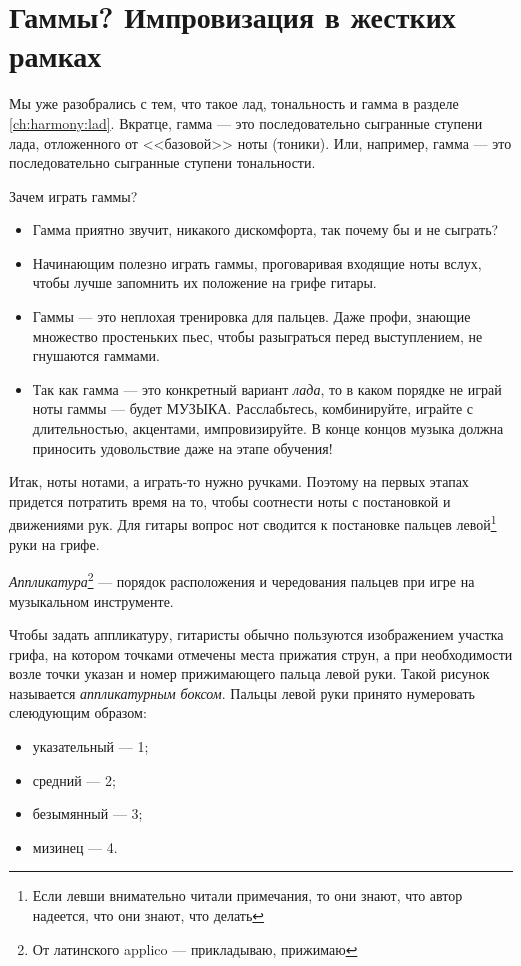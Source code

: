 \section{Гаммы? Импровизация в жестких рамках}
\label{ch:harmony:scales}

Мы уже разобрались с тем, что такое лад, тональность и гамма в разделе \ref{ch:harmony:lad}. Вкратце, гамма --- это последовательно сыгранные ступени лада, отложенного от <<базовой>> ноты (тоники). Или, например, гамма --- это последовательно сыгранные ступени тональности.

Зачем играть гаммы?
\begin{itemize}
    \item Гамма приятно звучит, никакого дискомфорта, так почему бы и не сыграть?
    \item Начинающим полезно играть гаммы, проговаривая входящие ноты вслух, чтобы лучше запомнить их положение на грифе гитары.
    \item Гаммы --- это неплохая тренировка для пальцев. Даже профи, знающие множество простеньких пьес, чтобы разыграться перед выступлением, не гнушаются гаммами.
    \item Так как гамма --- это конкретный вариант \emph{лада}, то в каком порядке не играй ноты гаммы --- будет МУЗЫКА. Расслабьтесь, комбинируйте, играйте с длительностью, акцентами, импровизируйте. В конце концов музыка должна приносить удовольствие даже на этапе обучения!
\end{itemize}

Итак, ноты нотами, а играть-то нужно ручками. Поэтому на первых этапах придется потратить время на то, чтобы соотнести ноты с постановкой и движениями рук. Для гитары вопрос нот сводится к постановке пальцев левой\footnote{Если левши внимательно читали примечания, то они знают, что автор надеется, что они знают, что делать} руки на грифе. 

\begin{Definition}[Аппликатура]
    \emph{Аппликатура}\footnote{От латинского applico --- прикладываю, прижимаю} --- порядок расположения и чередования пальцев при игре на музыкальном инструменте.
\end{Definition}

Чтобы задать аппликатуру, гитаристы обычно пользуются изображением участка грифа, на котором точками отмечены места прижатия струн, а при необходимости возле точки указан и номер прижимающего пальца левой руки. Такой рисунок называется \emph{аппликатурным боксом}. Пальцы левой руки принято нумеровать слеюдующим образом:
\begin{itemize}
    \item указательный --- 1;
    \item средний --- 2;
    \item безымянный --- 3;
    \item мизинец --- 4.
\end{itemize}

